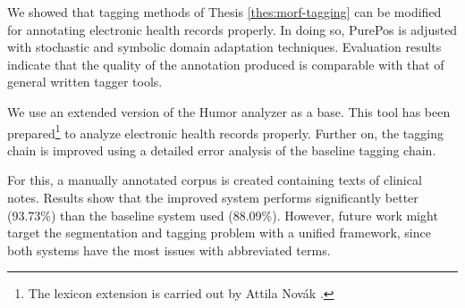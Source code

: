 \thesisline%

\begin{core}
\begin{thesis}%
\label{thes:clin-pos}
We showed that tagging methods of Thesis \ref{thes:morf-tagging} can be modified for annotating electronic health records properly.
In doing so, PurePos is adjusted with stochastic and symbolic domain adaptation techniques.
Evaluation results indicate that the quality of the annotation produced is comparable with that of general written tagger tools.
\end{thesis}

\begin{pub}
\cite{Orosz2013,Orosz2014b} 
\end{pub}
\end{core}

We use an extended version of the Humor analyzer as a base. 
This tool has been prepared\footnote{The lexicon extension is carried out by Attila Novák \cite{Orosz2014} .} to analyze electronic health records properly.
Further on, the tagging chain is improved using a detailed error analysis of the baseline tagging chain.

For this, a manually annotated corpus is created containing texts of clinical notes.
Results show that the improved system performs significantly better (93.73\%) than the baseline system used (88.09\%).
However, future work might target the segmentation and tagging problem with a unified framework, since both systems have the most issues with abbreviated terms.

\let\thesubsection=\oldthesubsection